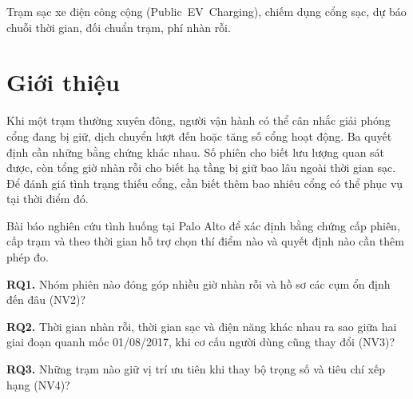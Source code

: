 \documentclass[conference,a4paper]{IEEEtran}
\begin{document}
\begin{abstract}
Đơn vị vận hành cần phân biệt ba vấn đề có biểu hiện giống nhau là xe giữ cổng sau khi sạc, nhu cầu tập trung theo giờ và thiếu cổng khả dụng. Nghiên cứu sử dụng 259.415 bản ghi tại Palo Alto để kết nối bằng chứng ở cấp phiên, trạm và khung 15 phút. Nhóm nhàn rỗi kéo dài chiếm 2,67\% số phiên nhưng đóng góp 41,20\% giờ nhàn rỗi. Ba trạm cùng dẫn đầu dưới hai bộ trọng số, trong khi 14 trong 33 trạm đổi ít nhất năm bậc. Trong kiểm thử nửa cuối năm 2019, XGBoost giảm căn sai số bình phương trung bình (RMSE) 4,72\% so với dự báo từ khung liền trước trên tám cụm có chuỗi chiếm dụng biến động. Khoảng tin cậy 95\% từ bootstrap khối bảy ngày là 4,32--5,09\%. Tuy nhiên, sai số tăng 30,16\% trong nửa cuối năm 2018. Kết quả định hướng thí điểm phí giữ cổng, giá sạc theo giờ và khảo sát sức chứa, với chỉ số đánh giá riêng cho từng quyết định.
\end{abstract}

\begin{IEEEkeywords}
Trạm sạc xe điện công cộng (\mbox{Public EV Charging}), chiếm dụng cổng sạc, dự báo chuỗi thời gian, đối chuẩn trạm, phí nhàn rỗi.
\end{IEEEkeywords}

\section{Giới thiệu}
\label{sec:intro}
Khi một trạm thường xuyên đông, người vận hành có thể cân nhắc giải phóng cổng đang bị giữ, dịch chuyển lượt đến hoặc tăng số cổng hoạt động. Ba quyết định cần những bằng chứng khác nhau. Số phiên cho biết lưu lượng quan sát được, còn tổng giờ nhàn rỗi cho biết hạ tầng bị giữ bao lâu ngoài thời gian sạc. Để đánh giá tình trạng thiếu cổng, cần biết thêm bao nhiêu cổng có thể phục vụ tại thời điểm đó.

Bài báo nghiên cứu tình huống tại Palo Alto để xác định bằng chứng cấp phiên, cấp trạm và theo thời gian hỗ trợ chọn thí điểm nào và quyết định nào cần thêm phép đo.

\noindent\textbf{RQ1.} Nhóm phiên nào đóng góp nhiều giờ nhàn rỗi và hồ sơ các cụm ổn định đến đâu (NV2)?

\noindent\textbf{RQ2.} Thời gian nhàn rỗi, thời gian sạc và điện năng khác nhau ra sao giữa hai giai đoạn quanh mốc 01/08/2017, khi cơ cấu người dùng cũng thay đổi (NV3)?

\noindent\textbf{RQ3.} Những trạm nào giữ vị trí ưu tiên khi thay bộ trọng số và tiêu chí xếp hạng (NV4)?
\end{document}
